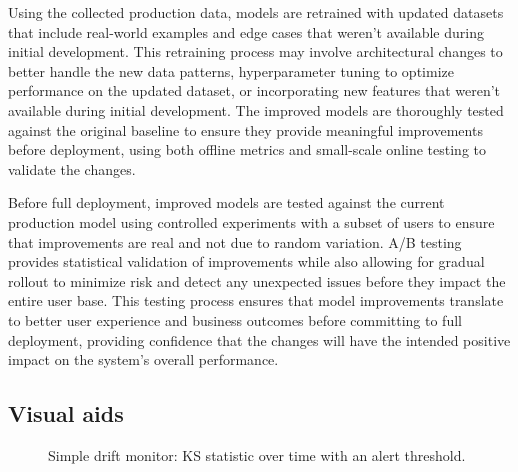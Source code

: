 Using the collected production data, models are retrained with updated datasets that include real-world examples and edge cases that weren't available during initial development. This retraining process may involve architectural changes to better handle the new data patterns, hyperparameter tuning to optimize performance on the updated dataset, or incorporating new features that weren't available during initial development. The improved models are thoroughly tested against the original baseline to ensure they provide meaningful improvements before deployment, using both offline metrics and small-scale online testing to validate the changes.

Before full deployment, improved models are tested against the current production model using controlled experiments with a subset of users to ensure that improvements are real and not due to random variation. A/B testing provides statistical validation of improvements while also allowing for gradual rollout to minimize risk and detect any unexpected issues before they impact the entire user base. This testing process ensures that model improvements translate to better user experience and business outcomes before committing to full deployment, providing confidence that the changes will have the intended positive impact on the system's overall performance.


\subsection{Visual aids}

\begin{figure}[h]
  \centering
  \caption{Simple drift monitor: KS statistic over time with an alert threshold.}
  \label{fig:drift-monitor}
\end{figure}

